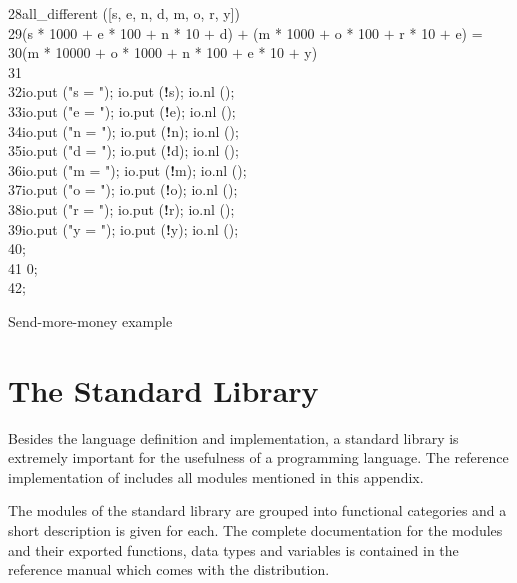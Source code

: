 \begin{appendix}
\begin{Program}
\begin{ttlprog}
28\>\>\>all\_different ([s, e, n, d, m, o, r, y]) \ttlAnd{}\\
29\>\>\>(s * 1000 $+$ e * 100 $+$ n * 10 $+$ d) $+$ (m * 1000 $+$ o * 100 $+$ r * 10 $+$ e) =\\
30\>\>\>(m * 10000 $+$ o * 1000 $+$ n * 100 $+$ e * 10 $+$ y)\\
31\>\>\ttlIn{}\\
32\>\>\>io.put ("s = "); io.put ({\bf!}s); io.nl ();\\
33\>\>\>io.put ("e = "); io.put ({\bf!}e); io.nl ();\\
34\>\>\>io.put ("n = "); io.put ({\bf!}n); io.nl ();\\
35\>\>\>io.put ("d = "); io.put ({\bf!}d); io.nl ();\\
36\>\>\>io.put ("m = "); io.put ({\bf!}m); io.nl ();\\
37\>\>\>io.put ("o = "); io.put ({\bf!}o); io.nl ();\\
38\>\>\>io.put ("r = "); io.put ({\bf!}r); io.nl ();\\
39\>\>\>io.put ("y = "); io.put ({\bf!}y); io.nl ();\\
40\>\>\ttlEnd{};\\
41\>\>\ttlReturn{} 0;\\
42\>\ttlEnd{};
\end{ttlprog}
\caption{Send-more-money example}
\label{prog:send-more-money}
\end{Program}

\chapter{The Standard Library}
\label{cha:turtle-library}

\newenvironment{modules}%
  {\newcommand\descr[2]{\index{##1@{\tt ##1} (Module)}%
\index{modules!##1@{\tt ##1}}%
{\tt ##1} \> ##2 \\}
   \begin{tabbing}
   \qquad\qquad\qquad\qquad\qquad \= \kill}
  {\end{tabbing}}

Besides the language definition and implementation, a standard library
is extremely important for the usefulness of a programming language.
The reference implementation of \turtle{} includes all modules
mentioned in this appendix.

The modules of the standard library are grouped into functional
categories and a short description is given for each.  The complete
documentation for the modules and their exported functions, data types
and variables is contained in the reference manual which comes with
the distribution.


\end{appendix}
